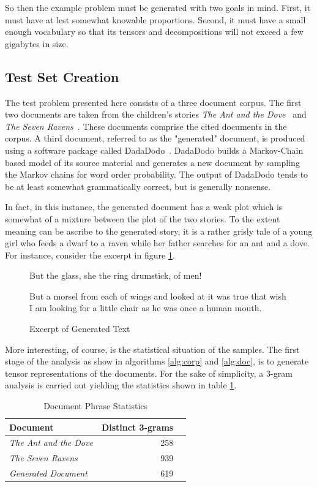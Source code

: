 \documentclass{article}
\begin{document}
So then the example problem must be generated with two goals in mind.
First, it must have at lest somewhat knowable proportions.  Second, it
must have a small enough vocabulary so that its tensors and
decompositions will not exceed a few gigabytes in size.

\subsection{Test Set Creation}
The test problem presented here consists of a three document corpus.
The first two documents are taken from the children's stories {\em The
Ant and the Dove}~\cite{aesop} and {\em The Seven
Ravens}~\cite{aesop}.  These documents comprise the cited documents in
the corpus.  A third document, referred to as the "generated"
document, is produced using a software package called
DadaDodo~\cite{dada}.  DadaDodo builds a Markov-Chain based model of
its source material and generates a new document by sampling the
Markov chains for word order probability.  The output of DadaDodo
tends to be at least somewhat grammatically correct, but is generally
nonsense. 

In fact, in this instance, the generated document has a weak plot
which is somewhat of a mixture between the plot of the two stories.
To the extent meaning can be ascribe to the generated story, it is
a rather grisly tale of a young girl who feeds a dwarf to a raven
while her father searches for an ant and a dove.  For instance,
consider the excerpt in figure \ref{fig:gentext}.

\begin{figure}
  \begin{displayquote}
But the glass, she the ring drumstick, of men! 

But a morsel from each of wings and looked at it was true that wish I am
looking for a little chair as he was once a human mouth. 
  \end{displayquote}
  \caption{Excerpt of Generated Text}
  \label{fig:gentext}
\end{figure}

More interesting, of course, is the statistical situation of the
samples.  The first stage of the analysis as show in 
algorithms \ref{alg:corp} and \ref{alg:doc}, is to generate tensor
representations of the documents.  For the sake of simplicity,
a 3-gram analysis is carried out yielding the statistics shown in
table \ref{tab:docstats}.

\begin{table}
    \begin{tabular}{l|r|r}
    {\bf Document} & {\bf Distinct 3-grams} \\
    \hline
    {\em The Ant and the Dove} & 258 \\
    {\em The Seven Ravens} & 939 \\
    \hline
    {\em Generated Document} & 619\\
    \end{tabular}
    \caption{Document Phrase Statistics}
    \label{tab:docstats}
\end{table}
\end{document}
